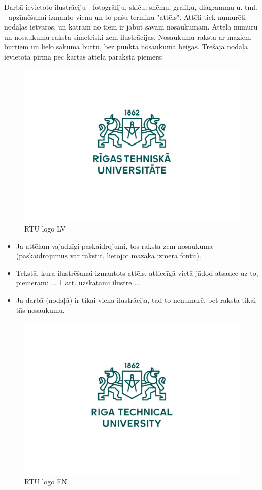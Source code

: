 Darbā ievietoto ilustrāciju - fotogrāfiju, skiču, shēmu, grafiku, diagrammu u. tml. -
apzīmēšanai izmanto vienu un to pašu terminu "attēls". Attēli tiek numurēti nodaļas
ietvaros, un katram no tiem ir jābūt savam nosaukumam. Attēla numuru un
nosaukumu raksta simetriski zem ilustrācijas. Nosaukumu raksta ar maziem burtiem
un lielo sākuma burtu, bez punkta nosaukuma beigās. Trešajā nodaļā ievietota pirmā
pēc kārtas attēla paraksta piemērs:
		\begin{figure}[H]
		  \centering
		  \includegraphics[width=.6\textwidth]{sections/pic/RTU_logotips_rgb_LV.pdf}
		  \caption{RTU logo LV}
		  \label{fig:rtu_lv}
		\end{figure}
\begin{itemize}
    \item Ja attēlam vajadzīgi paskaidrojumi, tos raksta zem nosaukuma (paskaidrojumus var rakstīt, lietojot mazāka izmēra fontu).
    \item Tekstā, kura ilustrēšanai izmantots attēls, attiecīgā vietā jādod atsauce uz to, piemēram: ... \ref{fig:rtu_lv} att. uzskatāmi ilustrē ...
    \item Ja darbā (nodaļā) ir tikai viena ilustrācija, tad to nenumurē, bet raksta tikai tās nosaukumu.	
\end{itemize}

        \begin{figure}[H]
		  \centering
		  \includegraphics[width=.3\textwidth]{sections/pic/RTU_logotips_rgb_EN.pdf}
		  \caption{RTU logo EN}
		  \label{fig:rtu_en}
		\end{figure}

